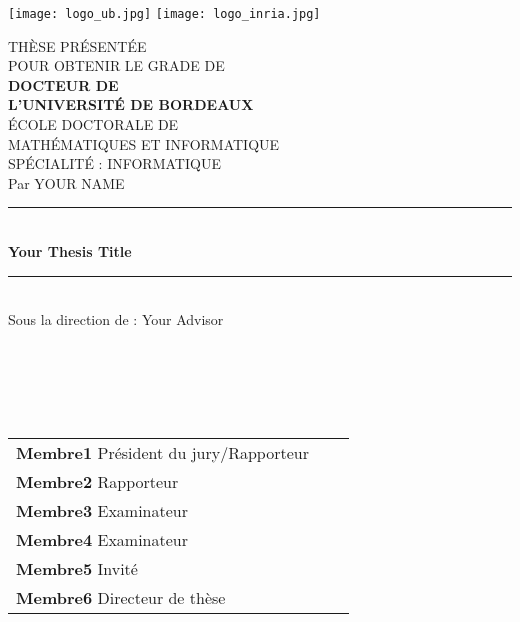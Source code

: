 \pagestyle{empty}
\begin{titlepage}
     \vspace*{-96pt}
     \noindent \hspace{-48pt}
     \texttt{[image: logo\_ub.jpg]}
     \hspace{148pt} \texttt{[image: logo\_inria.jpg]}
     \begin{center}
         \vspace{0.8cm}
         \large  TH\`{E}SE PR\'{E}SENT\'{E}E\\ POUR OBTENIR LE GRADE DE\\
         \vspace{0.5cm}
         \Large  {\bf DOCTEUR DE\\ L'UNIVERSIT\'{E} DE BORDEAUX}\\
         \vspace{1cm}
         \large \'{E}COLE DOCTORALE DE\\ MATH\'{E}MATIQUES ET INFORMATIQUE\\
         \vspace{0.5cm}
         \large SP\'{E}CIALIT\'{E} : INFORMATIQUE\\
         \vspace{1.2cm}
         \Large Par YOUR NAME\\
         \vspace{0.7cm}
         \rule{4em}{1pt}\\
         \vspace{0.7cm}
         \Large {\bf Your Thesis Title}\\
         \vspace{0.5cm}
         \rule{4em}{1pt}\\
         \vspace{0.7cm}
         \Large Sous la direction de : Your Advisor
         \vspace{0.5cm}
     \end{center}
     \vfill
      \\
     ~\\
      \\
     ~\\
     \begin{tabular}{lll@{}}
         \textbf{Membre1} Président du jury/Rapporteur\\
         \textbf{Membre2} Rapporteur\\
         \textbf{Membre3} Examinateur\\
         \textbf{Membre4} Examinateur\\
         \textbf{Membre5} Invité\\
         \textbf{Membre6} Directeur de thèse\\
     \end{tabular}
\end{titlepage}
\restoregeometry
\cleardoublepage
